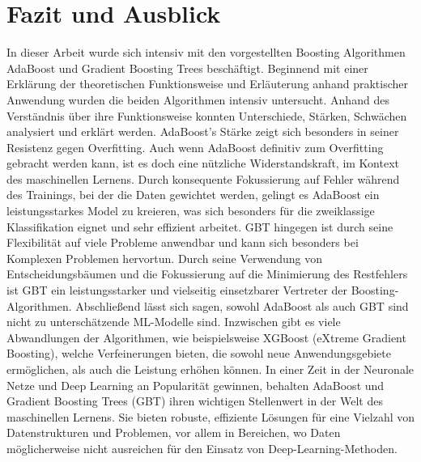 \section{Fazit und Ausblick}
In dieser Arbeit wurde sich intensiv mit den vorgestellten Boosting Algorithmen AdaBoost und Gradient Boosting Trees beschäftigt. Beginnend mit einer Erklärung der theoretischen Funktionsweise und Erläuterung anhand praktischer Anwendung wurden die beiden Algorithmen intensiv untersucht. Anhand des Verständnis über ihre Funktionsweise konnten Unterschiede, Stärken, Schwächen analysiert und erklärt werden.
\newline
AdaBoost's Stärke zeigt sich besonders in seiner Resistenz gegen Overfitting. Auch wenn AdaBoost definitiv zum Overfitting gebracht werden kann, ist es doch eine nützliche Widerstandskraft, im Kontext des maschinellen Lernens. Durch konsequente Fokussierung auf Fehler während des Trainings, bei der die Daten gewichtet werden, gelingt es AdaBoost ein leistungsstarkes Model zu kreieren, was sich besonders für die zweiklassige Klassifikation eignet und sehr effizient arbeitet.  
\newline
GBT hingegen ist durch seine Flexibilität auf viele Probleme anwendbar und kann sich besonders bei Komplexen Problemen hervortun. Durch seine Verwendung von Entscheidungsbäumen und die Fokussierung auf die Minimierung des Restfehlers ist GBT ein leistungsstarker und vielseitig einsetzbarer Vertreter der Boosting-Algorithmen.
\newline
\newline
Abschließend lässt sich sagen, sowohl AdaBoost als auch GBT sind nicht zu unterschätzende ML-Modelle sind. Inzwischen gibt es viele Abwandlungen der Algorithmen, wie beispielsweise XGBoost (eXtreme Gradient Boosting), welche Verfeinerungen bieten, die sowohl neue Anwendungsgebiete ermöglichen, als auch die Leistung erhöhen können. In einer Zeit in der Neuronale Netze und Deep Learning an Popularität gewinnen, behalten AdaBoost und Gradient Boosting Trees (GBT) ihren wichtigen Stellenwert in der Welt des maschinellen Lernens. Sie bieten robuste, effiziente Lösungen für eine Vielzahl von Datenstrukturen und Problemen, vor allem in Bereichen, wo Daten möglicherweise nicht ausreichen für den Einsatz von Deep-Learning-Methoden.